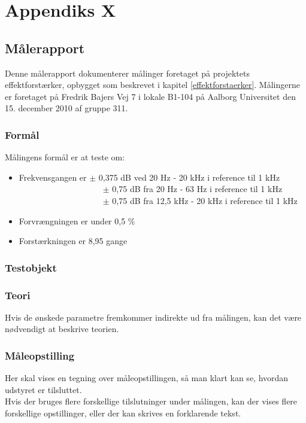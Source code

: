 

\chapter{Appendiks X}
\label{maalejournal}
\section*{Målerapport}
Denne målerapport dokumenterer målinger foretaget på projektets effektforstærker, opbygget som beskrevet i kapitel \ref{effektforstaerker}. Målingerne er foretaget på Fredrik Bajers Vej 7 i lokale B1-104 på Aalborg Universitet den 15. december 2010 af gruppe 311.

\subsection*{Formål}

Målingens formål er at teste om:

\begin{itemize}
\item Frekvensgangen er $\pm$ 0,375 dB ved 20 Hz - 20 kHz i reference til 1 kHz
\subitem ~~~~~~~~~~~~~~~~~~~~$\pm$ 0,75 dB fra 20 Hz - 63 Hz i reference til 1 kHz
\subitem ~~~~~~~~~~~~~~~~~~~~$\pm$ 0,75 dB fra 12,5 kHz - 20 kHz i reference til 1 kHz
\item Forvrængningen er under 0,5 \%
\item Forstærkningen er 8,95 gange
\end{itemize}

\subsection*{Testobjekt}


\subsection*{Teori}
Hvis de ønskede parametre fremkommer indirekte ud fra målingen, kan det være nødvendigt at beskrive teorien.\\

\subsection*{Måleopstilling}
Her skal vises en tegning over måleopstillingen, så man klart kan se, hvordan udstyret er tilsluttet.\\
Hvis der bruges flere forskellige tilslutninger under målingen, kan der vises flere forskellige opstillinger, eller der kan skrives en forklarende tekst.\\

